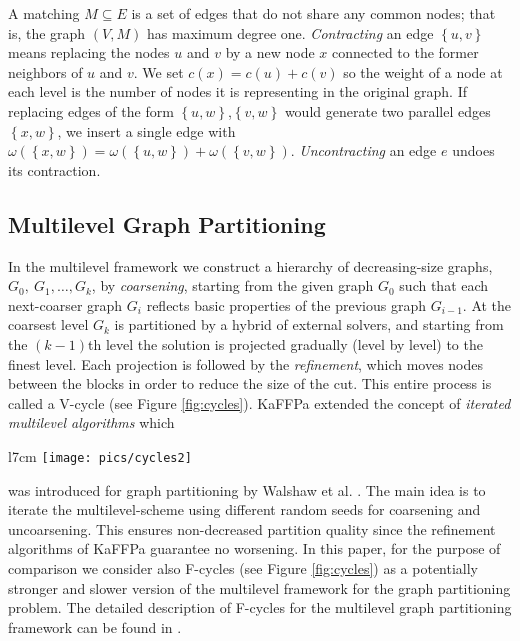 \documentclass{llncs}
\newcommand{\set}[1]{\left\{ #1\right\}}
\begin{document}
A matching $M\subseteq E$ is a set of edges that do not share any common nodes; that is, the graph $(V,M)$ has maximum degree one.  \emph{Contracting} an edge $\set{u,v}$ means replacing the nodes $u$ and $v$ by a new node $x$ connected
to the former neighbors of $u$ and $v$.
We set $c(x)=c(u)+c(v)$ so the weight of a node at each level is the number of nodes it is representing in the original graph. If replacing edges of the form $\set{u,w}$,$\set{v,w}$ would generate two parallel edges $\set{x,w}$, we insert a single edge with
$\omega(\set{x,w})=\omega(\set{u,w})+\omega(\set{v,w})$.
\emph{Uncontracting} an edge $e$ undoes its contraction.

\subsection{Multilevel Graph Partitioning}
In the multilevel framework we construct a hierarchy of decreasing-size graphs, $G_0,~G_1, \dots , G_k$,  by \emph{coarsening}, starting from the given graph $G_0$ such that each next-coarser graph $G_i$ reflects basic properties of the previous graph $G_{i-1}$. 
At the coarsest level $G_k$ is partitioned by a hybrid of external solvers, and starting from the $(k-1)$th level the solution is projected gradually (level by level) to the finest level. 
Each projection is followed by the \emph{refinement}, which moves nodes between the blocks in order to reduce the size of the cut.  
This entire process is called a V-cycle (see Figure \ref{fig:cycles}). KaFFPa \cite{kaffpa} extended the
concept of \emph{iterated multilevel algorithms}  which 
\begin{wrapfigure}{l}{7cm}
\centering
\vspace*{-.5cm}
\texttt{[image: pics/cycles2]}
\caption{V- and F-cycles schemes.}\label{fig:cycles}
\end{wrapfigure}
 was introduced for graph partitioning by Walshaw et al. \cite{walshaw2004multilevel}. 
The main idea is to iterate the multilevel-scheme using different random seeds for coarsening and uncoarsening. This ensures non-decreased partition quality since the refinement algorithms of KaFFPa guarantee no worsening.
In this paper, for the purpose of comparison we consider also F-cycles \cite{kaffpa} (see Figure \ref{fig:cycles})  as a potentially stronger and slower version of the multilevel framework for the graph partitioning problem. 
The detailed description of F-cycles for the multilevel graph partitioning framework can be found in \cite{kaffpa}.
\end{document}
